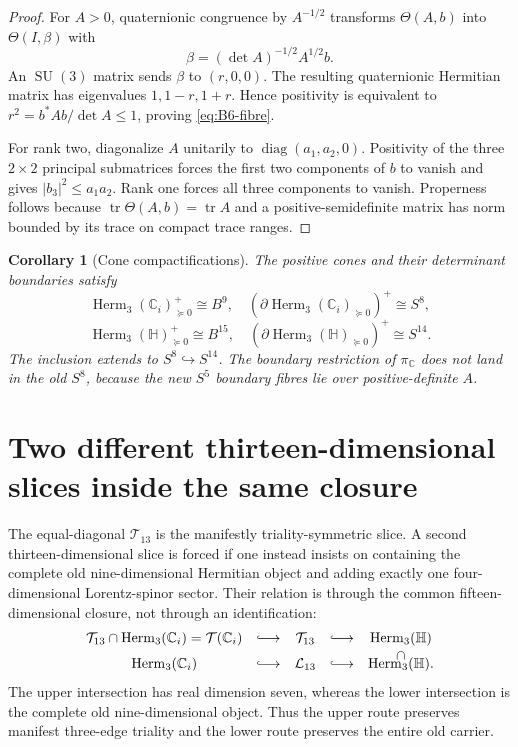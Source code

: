 \documentclass[11pt]{article}
\newtheorem{corollary}[theorem]{Corollary}
\theoremstyle{definition}
\theoremstyle{remark}
\newcommand{\C}{\mathbb C}
\newcommand{\Hh}{\mathbb H}
\newcommand{\Herm}{\operatorname{Herm}}
\newcommand{\tr}{\operatorname{tr}}
\newcommand{\diag}{\operatorname{diag}}
\newcommand{\SU}{\operatorname{SU}}
\newcommand{\cT}{\mathcal T}
\newcommand{\cL}{\mathcal L}
\begin{document}
\begin{proof}
For $A>0$, quaternionic congruence by $A^{-1/2}$ transforms $\Theta(A,b)$ into $\Theta(I,\beta)$ with
\[
 \beta=(\det A)^{-1/2}A^{1/2}b.
\]
An $\SU(3)$ matrix sends $\beta$ to $(r,0,0)$.  The resulting quaternionic Hermitian matrix has eigenvalues $1,1-r,1+r$.  Hence positivity is equivalent to
$r^2=b^*Ab/\det A\leq1$, proving \eqref{eq:B6-fibre}.

For rank two, diagonalize $A$ unitarily to $\diag(a_1,a_2,0)$.  Positivity of the three $2\times2$ principal submatrices forces the first two components of $b$ to vanish and gives $|b_3|^2\leq a_1a_2$.  Rank one forces all three components to vanish.  Properness follows because $\tr\Theta(A,b)=\tr A$ and a positive-semidefinite matrix has norm bounded by its trace on compact trace ranges.
\end{proof}

\begin{corollary}[Cone compactifications]\label{cor:cone-compactifications}
The positive cones and their determinant boundaries satisfy
\begin{equation}\label{eq:full-cone-balls}
 \Herm_3(\C_i)_{\succeq0}^{+}\cong B^9,
 \quad
 (\partial\Herm_3(\C_i)_{\succeq0})^{+}\cong S^8,
\end{equation}
\begin{equation}\label{eq:H-cone-balls}
 \Herm_3(\Hh)_{\succeq0}^{+}\cong B^{15},
 \quad
 (\partial\Herm_3(\Hh)_{\succeq0})^{+}\cong S^{14}.
\end{equation}
The inclusion extends to $S^8\hookrightarrow S^{14}$.  The boundary restriction of $\pi_{\C}$ does not land in the old $S^8$, because the new $S^5$ boundary fibres lie over positive-definite $A$.
\end{corollary}

\section{Two different thirteen-dimensional slices inside the same closure}

The equal-diagonal $\cT_{13}$ is the manifestly triality-symmetric slice.  A second thirteen-dimensional slice is forced if one instead insists on containing the complete old nine-dimensional Hermitian object and adding exactly one four-dimensional Lorentz-spinor sector.  Their relation is through the common fifteen-dimensional closure, not through an identification:
\begin{equation}\label{eq:two-13-diagram}
 \begin{array}{ccccc}
 \cT_{13}\cap\Herm_3(\C_i)=\cT(\C_i)&\lhook\joinrel\longrightarrow&\cT_{13}&\lhook\joinrel\longrightarrow&\Herm_3(\Hh)\\
 &&&&\rotatebox[origin=c]{90}{$\supset$}\\[-2mm]
 \Herm_3(\C_i)&\lhook\joinrel\longrightarrow&\cL_{13}&\lhook\joinrel\longrightarrow&\Herm_3(\Hh).
 \end{array}
\end{equation}
The upper intersection has real dimension seven, whereas the lower intersection is the complete old nine-dimensional object.  Thus the upper route preserves manifest three-edge triality and the lower route preserves the entire old carrier.
\end{document}
